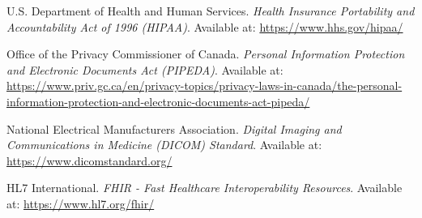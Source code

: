 \documentclass[12pt]{article}
\begin{document}
\pagebreak

\begin{thebibliography}{9}

% 

U.S. Department of Health and Human Services. \emph{Health Insurance Portability and Accountability Act of 1996 (HIPAA)}. Available at: \url{https://www.hhs.gov/hipaa/}

Office of the Privacy Commissioner of Canada. \emph{Personal Information Protection and Electronic Documents Act (PIPEDA)}. Available at: \url{https://www.priv.gc.ca/en/privacy-topics/privacy-laws-in-canada/the-personal-information-protection-and-electronic-documents-act-pipeda/}

National Electrical Manufacturers Association. \emph{Digital Imaging and Communications in Medicine (DICOM) Standard}. Available at: \url{https://www.dicomstandard.org/}

HL7 International. \emph{FHIR - Fast Healthcare Interoperability Resources}. Available at: \url{https://www.hl7.org/fhir/}

\end{thebibliography}


\end{document}
